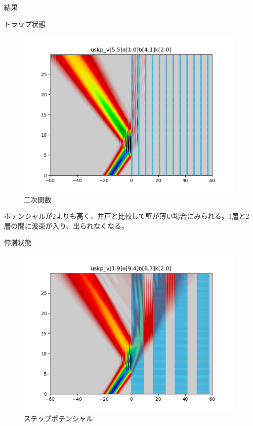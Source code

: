 \documentclass[a4paper, lualatex]{bxjsarticle}
\begin{document}
\begin{section}{結果}
\begin{subsection}{トラップ状態}
\begin{figure}[h]
\begin{minipage}{0.5\hsize}
                \includegraphics[width=0.9\hsize]{trap4.png}
                \caption{二次関数}
            \end{minipage}
        \end{figure}
    \par ポテンシャルが2よりも高く、井戸と比較して壁が薄い場合にみられる。1層と2層の間に波束が入り、出られなくなる。
    \end{subsection}
\newpage
    \begin{subsection}{停滞状態}
        \begin{figure}[h]
            \begin{minipage}{0.5\hsize}
                \centering
                \includegraphics[width=0.9\hsize]{teitai1.png}
                \caption{ステップポテンシャル}
            \end{minipage}
            \begin{minipage}{0.5\hsize}

\end{minipage}
\end{figure}
\end{subsection}
\end{section}
\end{document}
